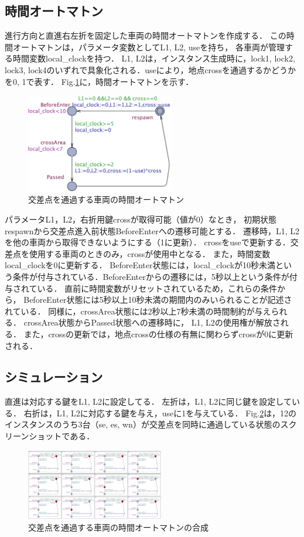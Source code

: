 \documentclass{jarticle}
\begin{document}
\subsection{時間オートマトン}
進行方向と直進右左折を固定した車両の時間オートマトンを作成する．
この時間オートマトンは，パラメータ変数としてL1, L2, useを持ち，
各車両が管理する時間変数local\_clockを持つ．
L1, L2は，インスタンス生成時に，lock1, lock2, lock3, lock4のいずれで具象化される．useにより，地点crossを通過するかどうかを0, 1で表す．
Fig.\ref{Simple}に，時間オートマトンを示す．

	\begin{figure}[htbp]
	\centering
	\includegraphics[width=65mm]{SimpleIntersection.png}
	\caption{交差点を通過する車両の時間オートマトン}
	\label{Simple}
	\end{figure}
パラメータL1，L2，右折用鍵crossが取得可能（値が0）なとき，
初期状態respawnから交差点進入前状態BeforeEnterへの遷移可能とする．
遷移時，L1, L2を他の車両から取得できないようにする（1に更新）．
crossをuseで更新する．交差点を使用する車両のときのみ，crossが使用中となる．
また，時間変数local\_clockを0に更新する．
BeforeEnter状態には，local\_clockが10秒未満という条件が付与されている．BeforeEnterからの遷移には，5秒以上という条件が付与されている．
直前に時間変数がリセットされているため，これらの条件から，
BeforeEnter状態には5秒以上10秒未満の期間内のみいられることが記述されている．
同様に，crossArea状態には2秒以上7秒未満の時間制約が与えられる．
crossArea状態からPassed状態への遷移時に，
L1, L2の使用権が解放される．
また，crossの更新では，地点crossの仕様の有無に関わらずcrossが0に更新される．
\subsection{シミュレーション}
直進は対応する鍵をL1, L2に設定してる．
左折は，L1, L2に同じ鍵を設定している．
右折は，L1, L2に対応する鍵を与え，useに1を与えている．
Fig.\ref{SimpleS}は，12のインスタンスのうち3台（se, es, wn）が交差点を同時に通過している状態のスクリーンショットである．
	\begin{figure}[htbp]
	\centering
	\includegraphics[width=60mm]{SimpleIntersectionSimu.png}
	\caption{交差点を通過する車両の時間オートマトンの合成}
	\label{SimpleS}
	\end{figure}
\end{document}
